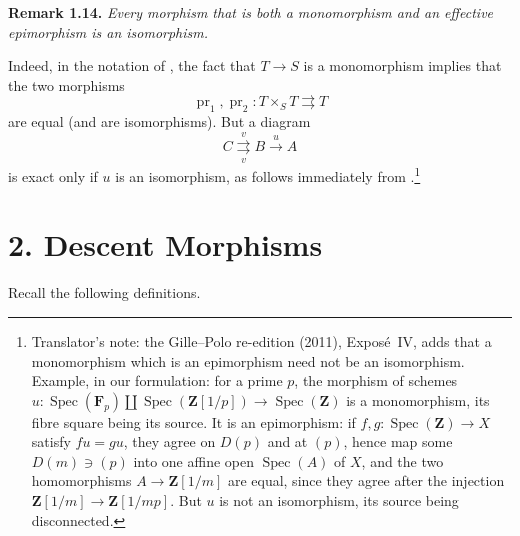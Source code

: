 \medskip
\noindent{}\textbf{Remark 1.14.}
\textit{Every morphism that is both a monomorphism and an effective
epimorphism is an isomorphism.}

Indeed, in the notation of , the fact that \(T\to S\) is a monomorphism
implies that the two morphisms
\[
  \operatorname{pr}_1,\operatorname{pr}_2:T\times_ST
  \rightrightarrows T
\]
are equal (and are isomorphisms). But a diagram
\[
  C\overset{v}{\underset{v}{\rightrightarrows}}B\xrightarrow{u}A
\]
is exact only if \(u\) is an isomorphism, as follows immediately from .\footnote{Translator's note: the Gille--Polo re-edition (2011), Expos\'e~IV, adds that
a monomorphism which is an epimorphism need not be an isomorphism. Example, in
our formulation: for a prime \(p\), the morphism of schemes
\(u\colon\operatorname{Spec}(\mathbf F_p)\amalg\operatorname{Spec}(\mathbf Z[1/p])
\to\operatorname{Spec}(\mathbf Z)\) is a monomorphism, its fibre square being
its source. It is an epimorphism: if
\(f,g\colon\operatorname{Spec}(\mathbf Z)\to X\) satisfy \(fu=gu\), they agree
on \(D(p)\) and at \((p)\), hence map some \(D(m)\ni(p)\) into one affine open
\(\operatorname{Spec}(A)\) of \(X\), and the two homomorphisms
\(A\to\mathbf Z[1/m]\) are equal, since they agree after the injection
\(\mathbf Z[1/m]\to\mathbf Z[1/mp]\). But \(u\) is not an isomorphism, its
source being disconnected.}

\section*{2. Descent Morphisms}

Recall the following definitions.

